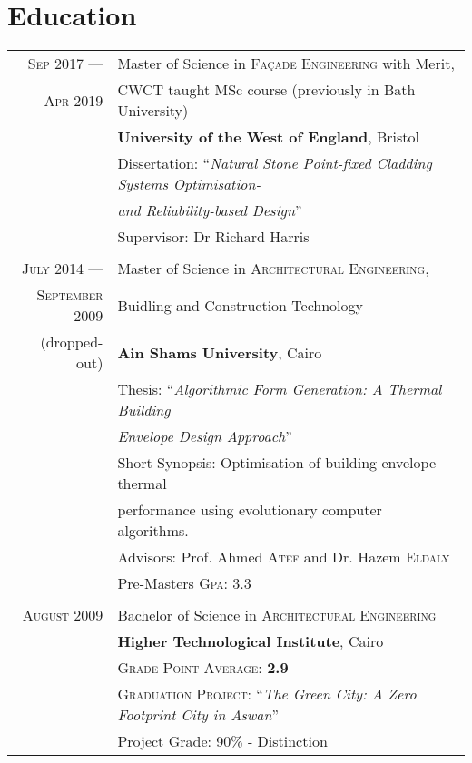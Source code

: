\documentclass[a4paper,11pt]{article} %
\begin{document}
\vspace{0.5cm}

\section{Education}
\begin{tabular}{r|l}	

\textsc{Sep} 2017 --- & Master of Science in \textsc{Façade Engineering} \scriptsize{with Merit},\\ 
\textsc{Apr} 2019 & \small CWCT taught MSc course (previously in Bath University)\\
&\textbf{University of the West of England}, Bristol\\
& Dissertation: ``\emph{Natural Stone Point-fixed Cladding Systems Optimisation- }\\
&\emph{and Reliability-based Design}'' \\
&\small Supervisor: Dr Richard Harris \\
\multicolumn{2}{c}{} \\

	
\textsc{July} 2014 --- & Master of Science in \textsc{Architectural Engineering},\\ 
\textsc{September} 2009 & Buidling and Construction Technology\\
\small(dropped-out)& \textbf{Ain Shams University}, Cairo \\
& Thesis: ``\emph{Algorithmic Form Generation: A Thermal Building}\\
&\emph{Envelope Design Approach}'' \\
&\small Short Synopsis: Optimisation of building envelope thermal\\
&\small performance using evolutionary computer algorithms.\\
& \small Advisors: Prof. Ahmed \textsc{Atef} and Dr. Hazem \textsc{Eldaly}\\
&\normalsize Pre-Masters \textsc{Gpa}: 3.3\\
\multicolumn{2}{c}{} \\


\textsc{August} 2009& Bachelor of Science in \textsc{Architectural Engineering} \\
& \normalsize\textbf{Higher Technological Institute}, Cairo\\
&\small \textsc{Grade Point Average}: \textbf{2.9} \\
&\small \textsc{Graduation Project:} ``\emph{The Green City: A Zero Footprint City in Aswan}''\\
&\small Project Grade: 90\% - Distinction\\

\end{tabular}
\end{document}
